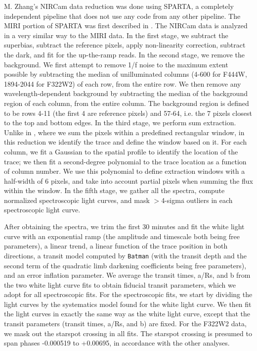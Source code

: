 \documentclass[sn-standardnature]{sn-jnl}%
\begin{document}
M. Zhang's NIRCam data reduction was done using SPARTA, a completely independent pipeline that does not use any code from any other pipeline. The MIRI portion of SPARTA was first described in . The NIRCam data is analyzed in a very similar way to the MIRI data. In the first stage, we subtract the superbias, subtract the reference pixels, apply non-linearity correction, subtract the dark, and fit for the up-the-ramp reads.  In the second stage, we remove the background. We first attempt to remove 1/f noise to the maximum extent possible by subtracting the median of unilluminated columns (4-600 for F444W, 1894-2044 for F322W2) of each row, from the entire row. We then remove any wavelength-dependent background by subtracting the median of the background region of each column, from the entire column. The background region is defined to be rows 4-11 (the first 4 are reference pixels) and 57-64, i.e. the 7 pixels closest to the top and bottom edges. In the third stage, we perform sum extraction. Unlike in , where we sum the pixels within a predefined rectangular window, in this reduction we identify the trace and define the window based on it. For each column, we fit a Gaussian to the spatial profile to identify the location of the trace; we then fit a second-degree polynomial to the trace location as a function of column number. We use this polynomial to define extraction windows with a half-width of 6 pixels, and take into account partial pixels when summing the flux within the window. In the fifth stage, we gather all the spectra, compute normalized spectroscopic light curves, and mask $>$4-sigma outliers in each spectroscopic light curve.

After obtaining the spectra, we trim the first 30 minutes and fit the white light curve with an exponential ramp (the amplitude and timescale both being free parameters), a linear trend, a linear function of the trace position in both directions, a transit model computed by \texttt{Batman}  (with the transit depth and the second term of the quadratic limb darkening coefficients being free parameters), and an error inflation parameter.  We average the transit times, a/Rs, and b from the two white light curve fits to obtain fiducial transit parameters, which we adopt for all spectroscopic fits.  For the spectroscopic fits, we start by dividing the light curves by the systematics model found for the white light curve.  We then fit the light curves in exactly the same way as the white light curve, except that the transit parameters (transit times, a/Rs, and b) are fixed.  For the F322W2 data, we mask out the starspot crossing in all fits.  The starspot crossing is presumed to span phases -0.000519 to +0.00695, in accordance with the other analyses.
\end{document}
